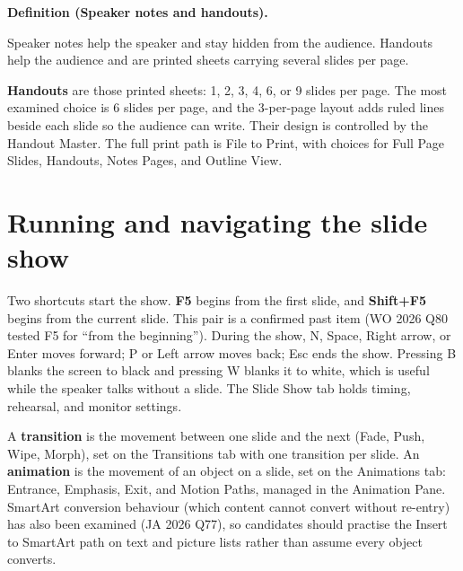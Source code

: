 \documentclass[11pt]{article}
\newenvironment{definitionbox}[1]{%
  \par\noindent\textbf{Definition (#1).}\ \itshape
}{\par\vspace{0.3em}}
\begin{document}
\begin{definitionbox}{Speaker notes and handouts}
Speaker notes help the speaker and stay hidden from the audience. Handouts
help the audience and are printed sheets carrying several slides per page.
\end{definitionbox}

\textbf{Handouts} are those printed sheets: 1, 2, 3, 4, 6, or 9 slides per
page. The most examined choice is 6 slides per page, and the 3-per-page layout
adds ruled lines beside each slide so the audience can write. Their design is
controlled by the Handout Master. The full print path is File to Print, with
choices for Full Page Slides, Handouts, Notes Pages, and Outline View.

\section{Running and navigating the slide show}
Two shortcuts start the show. \textbf{F5} begins from the first slide, and
\textbf{Shift+F5} begins from the current slide. This pair is a confirmed past
item (WO 2026 Q80 tested F5 for ``from the beginning''). During the show, N,
Space, Right arrow, or Enter moves forward; P or Left arrow moves back; Esc
ends the show. Pressing B blanks the screen to black and pressing W blanks it
to white, which is useful while the speaker talks without a slide. The Slide
Show tab holds timing, rehearsal, and monitor settings.

A \textbf{transition} is the movement between one slide and the next (Fade,
Push, Wipe, Morph), set on the Transitions tab with one transition per slide.
An \textbf{animation} is the movement of an object on a slide, set on the
Animations tab: Entrance, Emphasis, Exit, and Motion Paths, managed in the
Animation Pane. SmartArt conversion behaviour (which content cannot convert
without re-entry) has also been examined (JA 2026 Q77), so candidates should
practise the Insert to SmartArt path on text and picture lists rather than
assume every object converts.
\end{document}
